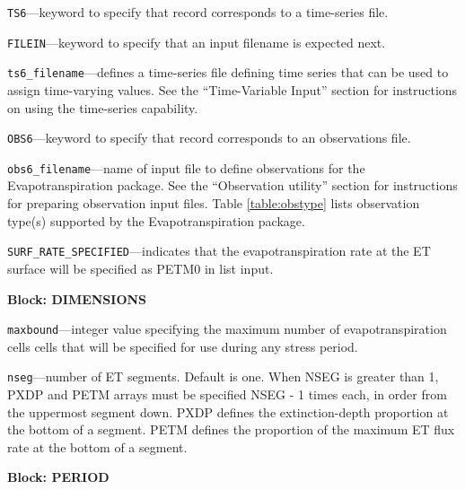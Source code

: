 \begin{description}
\item \texttt{TS6}---keyword to specify that record corresponds to a time-series file.

\item \texttt{FILEIN}---keyword to specify that an input filename is expected next.

\item \texttt{ts6\_filename}---defines a time-series file defining time series that can be used to assign time-varying values. See the ``Time-Variable Input'' section for instructions on using the time-series capability.

\item \texttt{OBS6}---keyword to specify that record corresponds to an observations file.

\item \texttt{obs6\_filename}---name of input file to define observations for the Evapotranspiration package. See the ``Observation utility'' section for instructions for preparing observation input files. Table \ref{table:obstype} lists observation type(s) supported by the Evapotranspiration package.

\item \texttt{SURF\_RATE\_SPECIFIED}---indicates that the evapotranspiration rate at the ET surface will be specified as PETM0 in list input.

\end{description}
\item \textbf{Block: DIMENSIONS}

\begin{description}
\item \texttt{maxbound}---integer value specifying the maximum number of evapotranspiration cells cells that will be specified for use during any stress period.

\item \texttt{nseg}---number of ET segments.  Default is one.  When NSEG is greater than 1, PXDP and PETM arrays must be specified NSEG - 1 times each, in order from the uppermost segment down. PXDP defines the extinction-depth proportion at the bottom of a segment. PETM defines the proportion of the maximum ET flux rate at the bottom of a segment.

\end{description}
\item \textbf{Block: PERIOD}

